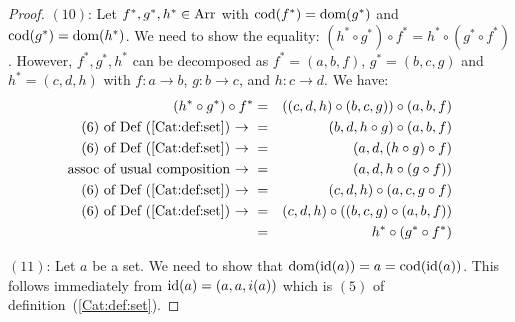 \begin{proof}
    $(10)$: Let $f^{*},g^{*},h^{*}\in\mbox{\rm Arr}$ with $\mbox{\rm cod}(f^{*})=\mbox{\rm dom}(g^{*})$ 
    and $\mbox{\rm cod}(g^{*})=\mbox{\rm dom}(h^{*})$. We need to show the equality:
    $(h^{*}\circ g^{*})\circ f^{*} = h^{*}\circ(g^{*}\circ f^{*})$.
    However, $f^{*},g^{*},h^{*}$ can be decomposed as 
    $f^{*}=(a,b,f)$, $g^{*}=(b,c,g)$ and $h^{*}=(c,d,h)$ with
    $f:a\to b$, $g:b \to c$, and $h:c\to d$. We have:
        \begin{eqnarray*}(h^{*}\circ g^{*})\circ f^{*}
            &=&((c,d,h)\circ(b,c,g))\circ (a,b,f)\\
            \mbox{$(6)$ of Def~(\ref{Cat:def:set})\ $\rightarrow$\ } 
            &=&(b,d,h\circ g)\circ (a,b,f)\\
            \mbox{$(6)$ of Def~(\ref{Cat:def:set})\ $\rightarrow$\ } 
            &=&(a,d,(h\circ g)\circ f)\\
            \mbox{assoc of usual composition\ $\rightarrow$\ }
            &=&(a,d,h\circ (g\circ f))\\
            \mbox{$(6)$ of Def~(\ref{Cat:def:set})\ $\rightarrow$\ } 
            &=&(c,d,h)\circ (a,c,g\circ f)\\
            \mbox{$(6)$ of Def~(\ref{Cat:def:set})\ $\rightarrow$\ } 
            &=&(c,d,h)\circ ((b,c,g)\circ(a,b,f))\\
            &=&h^{*}\circ(g^{*}\circ f^{*})
        \end{eqnarray*}
    
    $(11)$: Let $a$ be a set. We need to show that $\mbox{\rm dom}(\mbox{\rm id}(a))=a=\mbox{\rm cod}(\mbox{\rm id}(a))$.  
    This follows immediately from $\mbox{\rm id}(a)=(a,a,i(a))$ which is $(5)$ of
    definition~(\ref{Cat:def:set}).


\end{proof}

